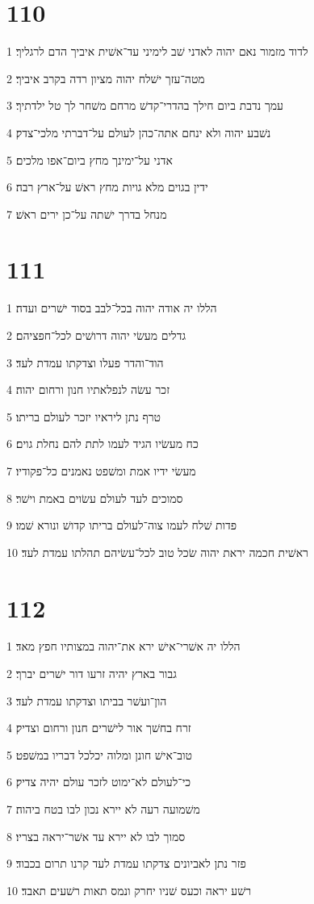 \chapter{110}

\par 1 לדוד מזמור נאם יהוה לאדני שׁב לימיני עד־אשׁית איביך הדם לרגליך׃
\par 2 מטה־עזך ישׁלח יהוה מציון רדה בקרב איביך׃
\par 3 עמך נדבת ביום חילך בהדרי־קדשׁ מרחם משׁחר לך טל ילדתיך׃
\par 4 נשׁבע יהוה ולא ינחם אתה־כהן לעולם על־דברתי מלכי־צדק׃
\par 5 אדני על־ימינך מחץ ביום־אפו מלכים׃
\par 6 ידין בגוים מלא גויות מחץ ראשׁ על־ארץ רבה׃
\par 7 מנחל בדרך ישׁתה על־כן ירים ראשׁ׃

\chapter{111}

\par 1 הללו יה אודה יהוה בכל־לבב בסוד ישׁרים ועדה׃
\par 2 גדלים מעשׂי יהוה דרושׁים לכל־חפציהם׃
\par 3 הוד־והדר פעלו וצדקתו עמדת לעד׃
\par 4 זכר עשׂה לנפלאתיו חנון ורחום יהוה׃
\par 5 טרף נתן ליראיו יזכר לעולם בריתו׃
\par 6 כח מעשׂיו הגיד לעמו לתת להם נחלת גוים׃
\par 7 מעשׂי ידיו אמת ומשׁפט נאמנים כל־פקודיו׃
\par 8 סמוכים לעד לעולם עשׂוים באמת וישׁר׃
\par 9 פדות שׁלח לעמו צוה־לעולם בריתו קדושׁ ונורא שׁמו׃
\par 10 ראשׁית חכמה יראת יהוה שׂכל טוב לכל־עשׂיהם תהלתו עמדת לעד׃

\chapter{112}

\par 1 הללו יה אשׁרי־אישׁ ירא את־יהוה במצותיו חפץ מאד׃
\par 2 גבור בארץ יהיה זרעו דור ישׁרים יברך׃
\par 3 הון־ועשׁר בביתו וצדקתו עמדת לעד׃
\par 4 זרח בחשׁך אור לישׁרים חנון ורחום וצדיק׃
\par 5 טוב־אישׁ חונן ומלוה יכלכל דבריו במשׁפט׃
\par 6 כי־לעולם לא־ימוט לזכר עולם יהיה צדיק׃
\par 7 משׁמועה רעה לא יירא נכון לבו בטח ביהוה׃
\par 8 סמוך לבו לא יירא עד אשׁר־יראה בצריו׃
\par 9 פזר נתן לאביונים צדקתו עמדת לעד קרנו תרום בכבוד׃
\par 10 רשׁע יראה וכעס שׁניו יחרק ונמס תאות רשׁעים תאבד׃

